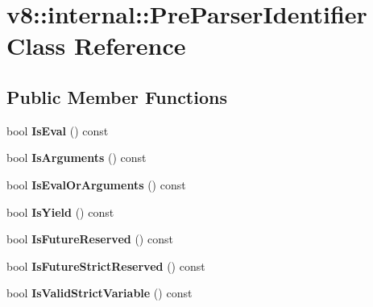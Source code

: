 \hypertarget{classv8_1_1internal_1_1_pre_parser_identifier}{}\section{v8\+:\+:internal\+:\+:Pre\+Parser\+Identifier Class Reference}
\label{classv8_1_1internal_1_1_pre_parser_identifier}
\subsection*{Public Member Functions}
\begin{DoxyCompactItemize}
\item 
\hypertarget{classv8_1_1internal_1_1_pre_parser_identifier_a8c7f8c1a4b57dc33168119ab82fdf3ee}{}bool {\bfseries Is\+Eval} () const \label{classv8_1_1internal_1_1_pre_parser_identifier_a8c7f8c1a4b57dc33168119ab82fdf3ee}

\item 
\hypertarget{classv8_1_1internal_1_1_pre_parser_identifier_ad008a16e01f3cf6fbc53addfaefb18d9}{}bool {\bfseries Is\+Arguments} () const \label{classv8_1_1internal_1_1_pre_parser_identifier_ad008a16e01f3cf6fbc53addfaefb18d9}

\item 
\hypertarget{classv8_1_1internal_1_1_pre_parser_identifier_a8ceda50a7b87f6dd5d84495176c620f3}{}bool {\bfseries Is\+Eval\+Or\+Arguments} () const \label{classv8_1_1internal_1_1_pre_parser_identifier_a8ceda50a7b87f6dd5d84495176c620f3}

\item 
\hypertarget{classv8_1_1internal_1_1_pre_parser_identifier_afbb58fce44a1620129122f616c724c67}{}bool {\bfseries Is\+Yield} () const \label{classv8_1_1internal_1_1_pre_parser_identifier_afbb58fce44a1620129122f616c724c67}

\item 
\hypertarget{classv8_1_1internal_1_1_pre_parser_identifier_a546fdd728a6ef0db6401510ce59b6f81}{}bool {\bfseries Is\+Future\+Reserved} () const \label{classv8_1_1internal_1_1_pre_parser_identifier_a546fdd728a6ef0db6401510ce59b6f81}

\item 
\hypertarget{classv8_1_1internal_1_1_pre_parser_identifier_a4e941780aa23a23c4ae518911d570314}{}bool {\bfseries Is\+Future\+Strict\+Reserved} () const \label{classv8_1_1internal_1_1_pre_parser_identifier_a4e941780aa23a23c4ae518911d570314}

\item 
\hypertarget{classv8_1_1internal_1_1_pre_parser_identifier_a11688ce9c1e8324cdc066694598fa038}{}bool {\bfseries Is\+Valid\+Strict\+Variable} () const \label{classv8_1_1internal_1_1_pre_parser_identifier_a11688ce9c1e8324cdc066694598fa038}


\end{DoxyCompactItemize}
